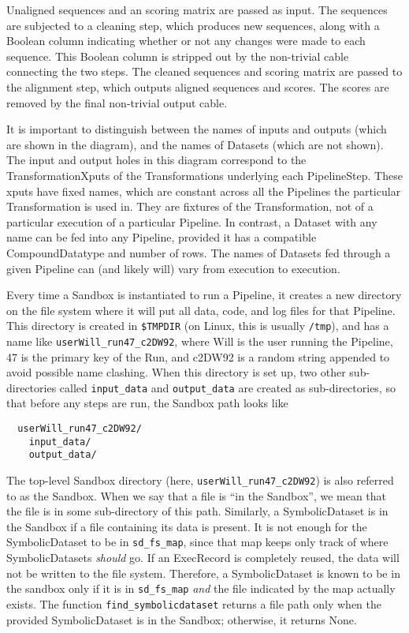 \documentclass[12pt]{article}
\newcommand{\code}[1]{\texttt{#1}}
\begin{document}
Unaligned sequences and an scoring matrix are passed as input. The sequences
are subjected to a cleaning step, which produces new sequences, along with a
Boolean column indicating whether or not any changes were made to each
sequence. This Boolean column is stripped out by the non-trivial cable
connecting the two steps. The cleaned sequences and scoring matrix are passed
to the alignment step, which outputs aligned sequences and scores. The scores
are removed by the final non-trivial output cable.

It is important to distinguish between the names of inputs and outputs (which
are shown in the diagram), and the names of Datasets (which are not shown). The
input and output holes in this diagram correspond to the TransformationXputs of
the Transformations underlying each PipelineStep. These xputs have fixed names,
which are constant across all the Pipelines the particular Transformation is
used in. They are fixtures of the Transformation, not of a particular execution
of a particular Pipeline. In contrast, a Dataset with any name can be fed into
any Pipeline, provided it has a compatible CompoundDatatype and number of rows.
The names of Datasets fed through a given Pipeline can (and likely will) vary
from execution to execution.

Every time a Sandbox is instantiated to run a Pipeline, it
creates a new directory on the file system where it will put all data, code,
and log files for that Pipeline. This directory is created in \code{\$TMPDIR}
(on Linux, this is usually \code{/tmp}), and has a name like
\code{userWill\_run47\_c2DW92}, where Will is the user running the Pipeline, 47
is the primary key of the Run, and c2DW92 is a random string appended to avoid
possible name clashing. When this directory is set up, two other
sub-directories called \code{input\_data} and \code{output\_data} are created
as sub-directories, so that before any steps are run, the Sandbox path looks
like
\begin{verbatim}
  userWill_run47_c2DW92/
    input_data/
    output_data/
\end{verbatim}

The top-level Sandbox directory (here, \code{userWill\_run47\_c2DW92}) is also
referred to as the Sandbox. When we say that a file is ``in the Sandbox'', we
mean that the file is in some sub-directory of this path. Similarly, a
SymbolicDataset is in the Sandbox if a file containing its data is present. It
is not enough for the SymbolicDataset to be in \code{sd\_fs\_map}, since that
map keeps only track of where SymbolicDatasets \emph{should} go. If an
ExecRecord is completely reused, the data will not be written to the file
system. Therefore, a SymbolicDataset is known to be in the sandbox only if it
is in \code{sd\_fs\_map} \emph{and} the file indicated by the map actually
exists. The function \code{find\_symbolicdataset} returns a file path only when
the provided SymbolicDataset is in the Sandbox; otherwise, it returns None.
\end{document}
